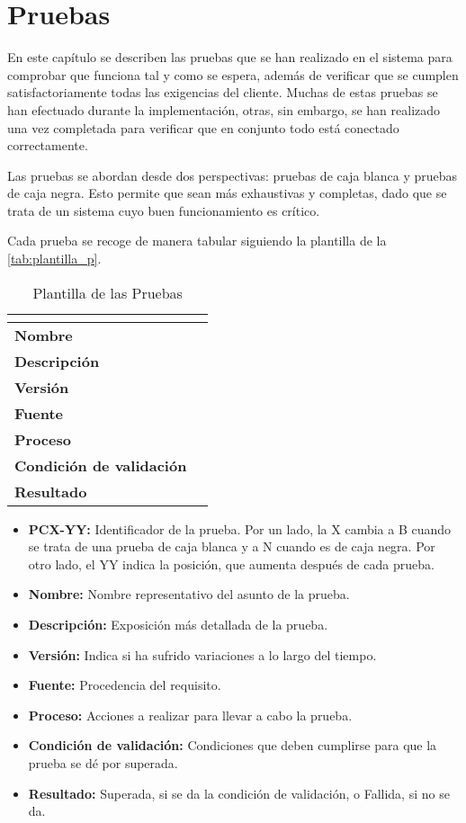 \chapter{Pruebas}
\label{ch:pruebas}
En este capítulo se describen las pruebas que se han realizado en el sistema para comprobar que funciona tal y como se espera, además de verificar que se cumplen satisfactoriamente todas las exigencias del cliente. Muchas de estas pruebas se han efectuado durante la implementación, otras, sin embargo, se han realizado una vez completada para verificar que en conjunto todo está conectado correctamente. 

Las pruebas se abordan desde dos perspectivas: pruebas de caja blanca y pruebas de caja negra. Esto permite que sean más exhaustivas y completas, dado que se trata de un sistema cuyo buen funcionamiento es crítico. 

Cada prueba se recoge de manera tabular siguiendo la plantilla de la \autoref{tab:plantilla_p}.
\begin{table}[H]
	\centering
	\caption{Plantilla de las Pruebas}
	\label{tab:plantilla_p}
	\begin{tabular}{|l|p{}|}
		\hline
		\multicolumn{2}{|c|}{\cellcolor[HTML]{BFBFBF}{\color[HTML]{000000} \textbf{PCX-YY}}} \\ \hline
		\textbf{Nombre}                  &   \\ \hline
		\textbf{Descripción}             &   \\ \hline
		\textbf{Versión}                 &   \\ \hline
		\textbf{Fuente}                  &   \\ \hline
		\textbf{Proceso}                 &   \\ \hline
		\textbf{Condición de validación} &   \\ \hline
		\textbf{Resultado}               &   \\ \hline
	\end{tabular}
\end{table}
\begin{itemize}
	\item \textbf{PCX-YY:} Identificador de la prueba. Por un lado, la X cambia a B cuando se trata de una prueba de caja blanca y a N cuando es de caja negra. Por otro lado, el YY indica la posición, que aumenta después de cada prueba.
	\item \textbf{Nombre:} Nombre representativo del asunto de la prueba.
	\item \textbf{Descripción:} Exposición más detallada de la prueba.
	\item \textbf{Versión:} Indica si ha sufrido variaciones a lo largo del tiempo.
	\item \textbf{Fuente:} Procedencia del requisito.
	\item \textbf{Proceso:} Acciones a realizar para llevar a cabo la prueba.
	\item \textbf{Condición de validación:} Condiciones que deben cumplirse para que la prueba se dé por superada.
	\item \textbf{Resultado:} Superada, si se da la condición de validación, o Fallida, si no se da.
\end{itemize}

